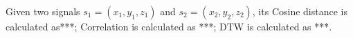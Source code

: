 Given two signals $s_1 = (x_1, y_1, z_1)$ and $s_2 = (x_2, y_2, z_2)$, its Cosine distance is calculated as***;   Correlation is calculated as ***; DTW is calculated as ***.  


